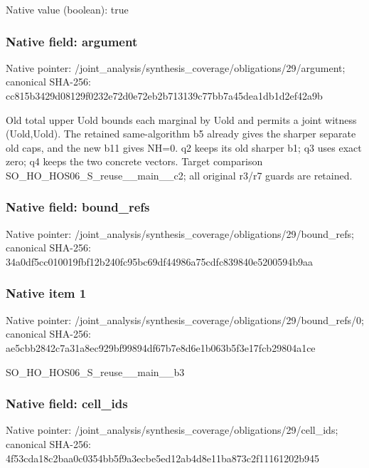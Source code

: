 \documentclass[10pt,a4paper]{article}
\begin{document}
Native value (boolean): true

\subsubsection{Native field: argument}
Native pointer: /joint\_\allowbreak{}analysis/synthesis\_\allowbreak{}coverage/obligations/29/argument; canonical SHA-256: cc815b3429d08129f0232e72d0e72eb2b713139c77bb7a45dea1db1d2ef42a9b

\begingroup\raggedright\sloppy Old total upper Uold bounds each marginal by Uold and permits a joint witness (Uold,\allowbreak{}Uold). The retained same-algorithm b5 already gives the sharper separate old caps,\allowbreak{} and the new b11 gives NH=\allowbreak{}0. q2 keeps its old sharper b1;\allowbreak{} q3 uses exact zero;\allowbreak{} q4 keeps the two concrete vectors. Target comparison SO\_\allowbreak{}HO\_\allowbreak{}HOS06\_\allowbreak{}S\_\allowbreak{}reuse\_\allowbreak{}\_\allowbreak{}main\_\allowbreak{}\_\allowbreak{}c2;\allowbreak{} all original r3/\allowbreak{}r7 guards are retained.\par\endgroup

\subsubsection{Native field: bound\_\allowbreak{}refs}
Native pointer: /joint\_\allowbreak{}analysis/synthesis\_\allowbreak{}coverage/obligations/29/bound\_\allowbreak{}refs; canonical SHA-256: 34a0df5cc010019fbf12b240fc95bc69df44986a75cdfc839840e5200594b9aa

\subsubsection{Native item 1}
Native pointer: /joint\_\allowbreak{}analysis/synthesis\_\allowbreak{}coverage/obligations/29/bound\_\allowbreak{}refs/0; canonical SHA-256: ae5cbb2842c7a31a8ec929bf99894df67b7e8d6e1b063b5f3e17fcb29804a1ce

\begingroup\raggedright\sloppy SO\_\allowbreak{}HO\_\allowbreak{}HOS06\_\allowbreak{}S\_\allowbreak{}reuse\_\allowbreak{}\_\allowbreak{}main\_\allowbreak{}\_\allowbreak{}b3\par\endgroup

\subsubsection{Native field: cell\_\allowbreak{}ids}
Native pointer: /joint\_\allowbreak{}analysis/synthesis\_\allowbreak{}coverage/obligations/29/cell\_\allowbreak{}ids; canonical SHA-256: 4f53cda18c2baa0c0354bb5f9a3ecbe5ed12ab4d8e11ba873c2f11161202b945
\end{document}

